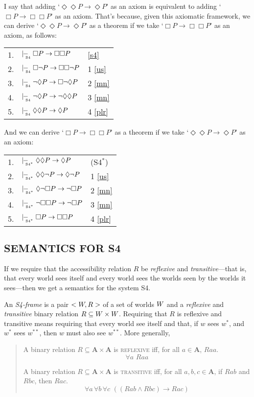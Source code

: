 \documentclass[landscape, two column, full page,reqno]{article}
\let\mathcal\relax
\newcommand{\mathcal}{\OMScal}%
\newcommand{\qd}{\begin{quote}\begin{description}  [align=left,style=nextline,leftmargin=*,labelsep=0pt,font=\normalfont]}
\newcommand{\zd}{\end{description}\end{quote}}
\newcommand{\p}{\item}
\newcommand{\e}{\emph}
\newcommand{\mbf}{\mathbf}
\newcommand{\s}{\textsc}
\newcommand{\tnot}{\neg}
\newcommand{\fns}[1]{{\footnotesize #1}}
\newcommand{\sfourproves}{\mid\hspace{-3.9pt}-_{\!\!\!\raisebox{-3pt}{\text{\tiny S4}}}\hspace{3pt}}
\newcommand{\sfourpproves}{\mid\hspace{-3.9pt}-_{\!\!\!\raisebox{-3pt}{\text{\tiny S4$^*$}}}\hspace{3pt}}
\newcommand{\D}{\Diamond}
\newcommand{\B}{\Box}
\newcommand{\hs}{\hspace{2pt}}
\newcommand{\aproof}[2]{\begin{center}
\begin{tabularx}{#1}{l X l}
#2
\end{tabularx}
\end{center}}
\begin{document}
\p I say that adding `$\D \D P \to \D P$' as an axiom is equivalent to adding `$\B P \to \B \B P$' as an axiom.  That's because, given this axiomatic framework, we can derive `$\D \D P \to \D P$' as a theorem if we take  `$\B P \to \B \B P$' as an axiom, as follows:
		\aproof{250pt}{
		1. & $\sfourproves \B P \to \B \B P$			& \eqref{s4}	\\
		2. & $\sfourproves \B \tnot P \to \B \B \tnot P$	& 1 \eqref{us}	\\
		3. & $\sfourproves \tnot \D P \to \B \tnot \D P$	& 2 \eqref{mn}	\\
		4. & $\sfourproves \tnot \D P \to \tnot \D \D P$	& 3 \eqref{mn}	\\
		5. & $\sfourproves \D \D P \to \D P$			& 4 \eqref{plr}
		}
And we can derive `$\B P \to \B\B P$' as a theorem if we take `$\D\D P \to \D P$' as an axiom:
\aproof{250pt}{
1. & $\sfourpproves \D\D P \to \D P$				& (S4$^*$)	\\
2. & $\sfourpproves \D \D \tnot P \to \D \tnot P$		& 1 \eqref{us}	\\
3. & $\sfourpproves \D \tnot \B P \to \tnot \B P$		& 2 \eqref{mn}	\\
4. & $\sfourpproves \tnot \B \B P \to \tnot \B P$		& 3 \eqref{mn}	\\
5. & $\sfourpproves \B P \to \B \B P$				& 4 \eqref{plr}
}

\subsection{S\fns{EMANTICS} F\fns{OR} S4}
If we require that the accessibility relation $R$ be \e{reflexive} and \e{transitive}---that is, that every world sees itself and every world sees the worlds seen by  the worlds it sees---then we get a semantics for the system S4.

\p An \e{S4-frame} is a pair $< \mathcal{W}, R >$ of a set of worlds $\mathcal{W}$ and a \e{reflexive} and \e{transitive} binary relation $R \subseteq \mathcal{W} \times \mathcal{W}$.  Requiring that $R$ is reflexive and transitive means requiring that every world see itself and that, if $w$ sees $w^*$, and $w^*$ sees $w^{**}$, then $w$ must also see $w^{**}$.  More generally,
	\qd
	\p[\s{reflexivity}] A binary relation $R \subseteq \mbf{A} \times \mbf{A}$ is \s{reflexive} iff, for all $a \in \mbf{A}$, $Raa$.
		\[
		\forall a \hs\hs Raa
		\]
	\p[\s{transitivity}] A binary relation $R \subseteq \mbf{A} \times \mbf{A}$ is \s{transitive} iff, for all $a, b, c \in \mbf{A}$, if $Rab$ and $Rbc$, then $Rac$.
		\[
		\forall a \hs \forall b \hs \forall c \hs\hs ((R ab \wedge Rbc) \to Rac)
		\]
	\zd
\end{document}
